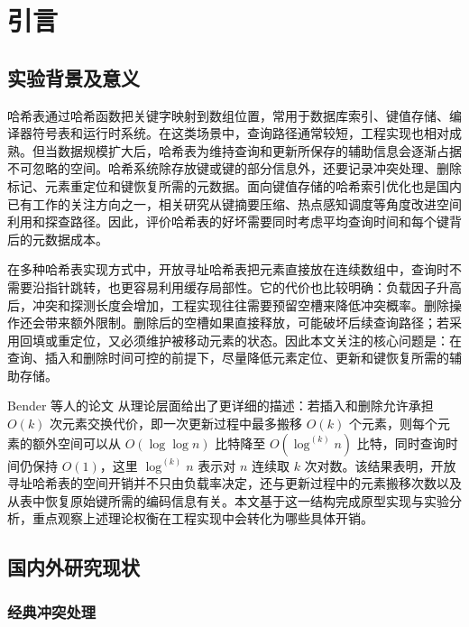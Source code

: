 \chapter{引言}

\section{实验背景及意义}

哈希表通过哈希函数把关键字映射到数组位置\cite{bender2024sosa}，常用于数据库索引、键值存储、编译器符号表和运行时系统\cite{chang2006bigtable,dong2021rocksdb}。在这类场景中，查询路径通常较短，工程实现也相对成熟。但当数据规模扩大后，哈希表为维持查询和更新所保存的辅助信息会逐渐占据不可忽略的空间。哈希系统除存放键或键的部分信息外，还要记录冲突处理、删除标记、元素重定位和键恢复所需的元数据。面向键值存储的哈希索引优化也是国内已有工作的关注方向之一，相关研究从键摘要压缩、热点感知调度等角度改进空间利用和探查路径\cite{wang2024hotaware}。因此，评价哈希表的好坏需要同时考虑平均查询时间和每个键背后的元数据成本。

在多种哈希表实现方式中，开放寻址哈希表把元素直接放在连续数组中，查询时不需要沿指针跳转，也更容易利用缓存局部性。它的代价也比较明确：负载因子升高后，冲突和探测长度会增加，工程实现往往需要预留空槽来降低冲突概率。删除操作还会带来额外限制。删除后的空槽如果直接释放，可能破坏后续查询路径；若采用回填或重定位，又必须维护被移动元素的状态。因此本文关注的核心问题是：在查询、插入和删除时间可控的前提下，尽量降低元素定位、更新和键恢复所需的辅助存储。

Bender 等人的论文\cite{bender2022otsh} 从理论层面给出了更详细的描述：若插入和删除允许承担 \(O(k)\) 次元素交换代价，即一次更新过程中最多搬移 \(O(k)\) 个元素，则每个元素的额外空间可以从 \(O(\log\log n)\) 比特降至 \(O(\log^{(k)}n)\) 比特，同时查询时间仍保持 \(O(1)\)，这里 \(\log^{(k)}n\) 表示对 \(n\) 连续取 \(k\) 次对数。该结果表明，开放寻址哈希表的空间开销并不只由负载率决定，还与更新过程中的元素搬移次数以及从表中恢复原始键所需的编码信息有关。本文基于这一结构完成原型实现与实验分析，重点观察上述理论权衡在工程实现中会转化为哪些具体开销。

\section{国内外研究现状}

\subsection{经典冲突处理}

